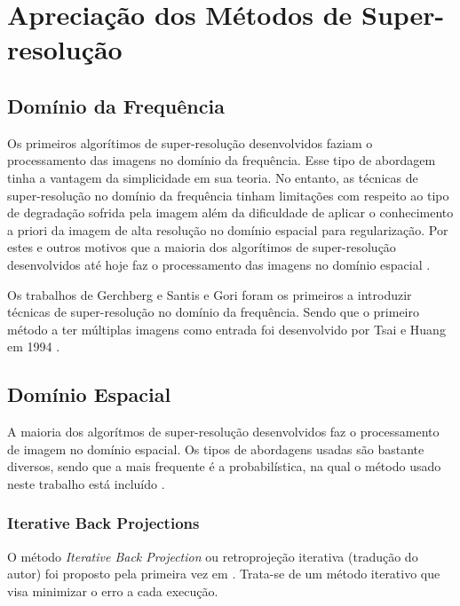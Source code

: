 \section{Apreciação dos Métodos de Super-resolução} 
\subsection{Domínio da Frequência}

Os primeiros algorítimos de super-resolução desenvolvidos faziam o processamento das imagens no domínio da frequência.
Esse tipo de abordagem tinha a vantagem da simplicidade em sua teoria.
No entanto, as técnicas de super-resolução no domínio da frequência tinham limitações com respeito ao tipo de degradação sofrida pela imagem além da dificuldade de aplicar o conhecimento a priori da imagem de alta resolução no domínio espacial para regularização.
Por estes e outros motivos que a maioria dos algorítimos de super-resolução desenvolvidos até hoje faz o processamento das imagens no domínio espacial \cite{park2003super}.

Os trabalhos de Gerchberg \cite{Gerchberg1974} e Santis e Gori \cite{de1975iterative} foram os primeiros a introduzir técnicas de super-resolução no domínio da frequência.
Sendo que o primeiro método a ter múltiplas imagens como entrada foi desenvolvido por Tsai e Huang em 1994 \cite{nasrollahi2014super}.



\subsection{Domínio Espacial}
A maioria dos algorítmos de super-resolução desenvolvidos faz o processamento de imagem no domínio espacial.
Os tipos de abordagens usadas são bastante diversos, sendo que a mais frequente é a probabilística, na qual o método usado neste trabalho está incluído \cite{nasrollahi2014super}.

\subsubsection{Iterative Back Projections}

O método \emph{Iterative Back Projection} ou retroprojeção iterativa (tradução do autor) foi proposto pela primeira vez em \cite{irani1991improv}.
Trata-se de um método iterativo que visa minimizar o erro a cada execução.

